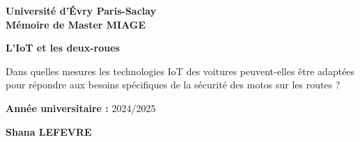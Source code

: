 \documentclass{article}
\begin{document}
\begin{titlepage}
  \centering
  \noindent{}

  \vspace{1.8cm}

  {\large \textbf{Université d'Évry Paris-Saclay}}\\[0.4cm]
  {\large \textbf{Mémoire de Master MIAGE}}%

  \vspace{1.4cm}

  {\LARGE \bfseries L’IoT et les deux-roues\par}
  \vspace{0.7cm}
  \begin{minipage}{0.9\textwidth}
    \centering
    {\large
    Dans quelles mesures les technologies IoT des voitures peuvent-elles être
    adaptées pour répondre aux besoins spécifiques de la sécurité des motos sur les routes ?%
    }
  \end{minipage}

  \vspace{1.4cm}

  {\large \textbf{Année universitaire :} 2024/2025\par}
  \vspace{0.5cm}
  {\large \textbf{Shana \MakeUppercase{Lefevre}}\par}


\end{titlepage}
\end{document}
